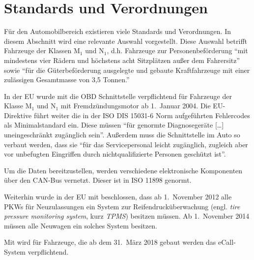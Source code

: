 \section{Standards und Verordnungen}
Für den Automobilbereich existieren viele Standards und Verordnungen. In diesem
Abschnitt wird eine relevante Auswahl vorgestellt. Diese Auswahl betrifft
Fahrzeuge der Klassen M$_1$ und N$_1$, d.h. Fahrzeuge zur Personenbeförderung
\enquote{mit mindestens vier Rädern und höchstens acht Sitzplätzen außer dem Fahrersitz}
sowie \enquote{für die Güterbeförderung ausgelegte und gebaute Kraftfahrzeuge
mit einer zulässigen Gesamtmasse von 3,5 Tonnen.}\cite{Richtlinie70/156/EWG:Fahrzeugklassen}

In der EU wurde mit \cite{EUDirective98/69/EC} die OBD Schnittstelle
verpflichtend für Fahrzeuge der Klasse M$_1$ und N$_1$ mit Fremdzündungsmotor
ab 1.~Januar 2004. Die EU-Direktive führt weiter die in der ISO DIS 15031-6
Norm aufgeführten Fehlercodes als Minimalstandard ein. Diese müssen
\enquote{für genormte Diagnosegeräte [\dots] uneingeschränkt zugänglich sein}.
Außerdem muss die Schnittstelle im Auto so verbaut werden, dass sie
\enquote{für das Servicepersonal leicht zugänglich, zugleich aber vor
unbefugten Eingriffen durch nichtqualifizierte Personen geschützt ist}.

Um die Daten bereitzustellen, werden verschiedene elektronische Komponenten
über den CAN-Bus vernetzt. Dieser ist in ISO 11898 genormt.

Weiterhin wurde in der EU mit \cite{EURegulation661/2009} beschlossen, dass ab
1.~November 2012 alle PKWs für Neuzulassungen ein System zur
Reifendrucküberwachung (engl. \textit{tire pressure monitoring system}, kurz
\textit{TPMS}) besitzen müssen. Ab 1.~November 2014 müssen alle Neuwagen ein
solches System besitzen.

Mit \cite{EURegulation2015/ecall} wird für Fahrzeuge, die ab dem 31.~März 2018
gebaut werden das eCall-System verpflichtend.
